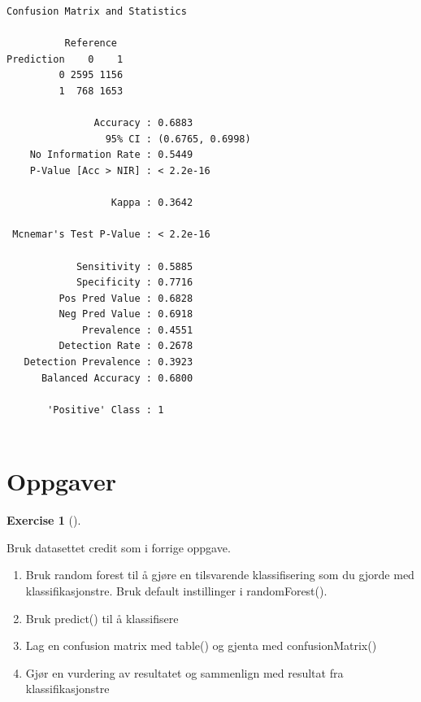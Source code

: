 \documentclass[
  letterpaper,
  DIV=11,
  numbers=noendperiod]{scrreprt}
\providecommand{\tightlist}{%
  \setlength{\itemsep}{0pt}\setlength{\parskip}{0pt}}\usepackage{longtable,booktabs,array}
\theoremstyle{definition}
\newtheorem{exercise}{Exercise}[chapter]
\theoremstyle{remark}
\begin{document}
\begin{verbatim}
Confusion Matrix and Statistics

          Reference
Prediction    0    1
         0 2595 1156
         1  768 1653
                                          
               Accuracy : 0.6883          
                 95% CI : (0.6765, 0.6998)
    No Information Rate : 0.5449          
    P-Value [Acc > NIR] : < 2.2e-16       
                                          
                  Kappa : 0.3642          
                                          
 Mcnemar's Test P-Value : < 2.2e-16       
                                          
            Sensitivity : 0.5885          
            Specificity : 0.7716          
         Pos Pred Value : 0.6828          
         Neg Pred Value : 0.6918          
             Prevalence : 0.4551          
         Detection Rate : 0.2678          
   Detection Prevalence : 0.3923          
      Balanced Accuracy : 0.6800          
                                          
       'Positive' Class : 1               
                                          
\end{verbatim}

\hypertarget{oppgaver-5}{%
\section{Oppgaver}\label{oppgaver-5}}

\leavevmode{}%
\begin{exercise}[]\label{exr-}

Bruk datasettet credit som i forrige oppgave.

\begin{enumerate}
\def\labelenumi{\alph{enumi})}
\tightlist
\item
  Bruk random forest til å gjøre en tilsvarende klassifisering som du
  gjorde med klassifikasjonstre. Bruk default instillinger i
  randomForest().
\item
  Bruk predict() til å klassifisere
\item
  Lag en confusion matrix med table() og gjenta med confusionMatrix()
\item
  Gjør en vurdering av resultatet og sammenlign med resultat fra
  klassifikasjonstre
\end{enumerate}

\end{exercise}
\end{document}
